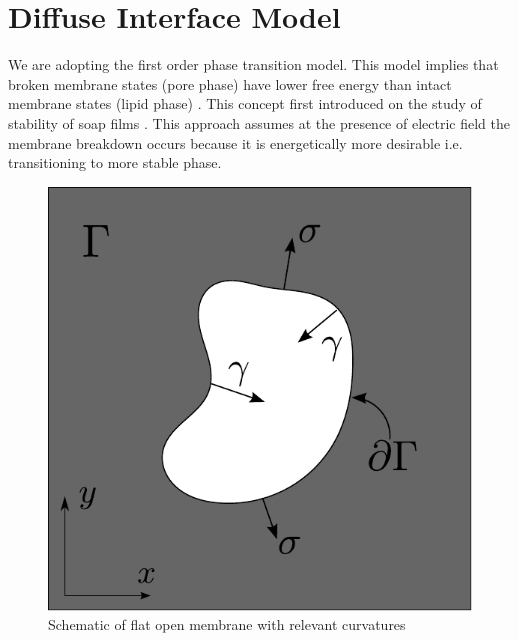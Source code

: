 \documentclass[english,12pt]{article}
\begin{document}
\section{Diffuse Interface Model}
We are adopting the first order phase transition model. This model implies that broken membrane states (pore phase) have lower free energy than intact membrane states (lipid phase) . This concept first introduced on the study of stability of soap films \cite{deryagin1962theory}. This approach assumes at the presence of electric field the membrane breakdown occurs because it is energetically more desirable i.e. transitioning to more stable phase.
\begin{figure}[H]
	\centering
	\includegraphics[scale=0.55]{pics/model1_1.pdf}
	\caption{Schematic of flat open membrane with relevant curvatures}
	\label{fig:model1}
\end{figure}
\end{document}
